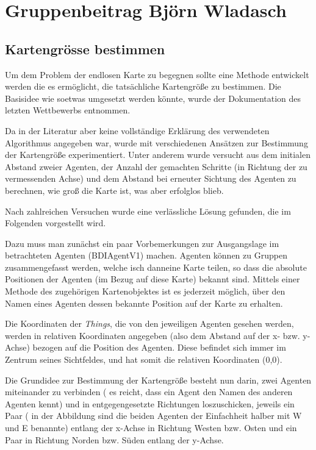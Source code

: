 \documentclass[runningheads]{llncs}
\begin{document}
	\section{Gruppenbeitrag Björn Wladasch}
	\subsection{Kartengrösse bestimmen}
	Um dem Problem der endlosen Karte zu begegnen sollte eine Methode entwickelt werden die es ermöglicht, die tatsächliche Kartengröße zu bestimmen. Die Basisidee wie soetwas umgesetzt werden könnte, wurde der Dokumentation des letzten Wettbewerbs \cite{MAPC2021} entnommen.  
	
	Da in der Literatur aber keine vollständige Erklärung des verwendeten Algorithmus angegeben war, wurde mit verschiedenen Ansätzen zur Bestimmung der Kartengröße experimentiert. Unter anderem wurde versucht aus dem initialen Abstand zweier Agenten, der Anzahl der gemachten Schritte (in Richtung der zu vermessenden Achse) und dem Abstand bei erneuter Sichtung des Agenten zu berechnen, wie groß die Karte ist, was aber erfolglos blieb.
	
	Nach zahlreichen Versuchen wurde eine verlässliche Lösung gefunden, die im Folgenden vorgestellt wird.
	
	Dazu muss man zunächst ein paar Vorbemerkungen zur Ausgangslage im betrachteten Agenten (BDIAgentV1) machen. Agenten können zu Gruppen zusammengefasst werden, welche isch danneine Karte teilen, so dass die absolute Positionen der Agenten (im Bezug auf diese Karte) bekannt sind. Mittels einer Methode des zugehörigen Kartenobjektes ist es jederzeit möglich, über den Namen eines Agenten dessen bekannte Position auf der Karte zu erhalten.
	
	Die Koordinaten der \textit{Things}, die von den jeweiligen Agenten gesehen werden, werden in relativen Koordinaten angegeben (also dem Abstand auf der x- bzw. y-Achse) bezogen auf die Position des Agenten. Diese befindet sich immer im Zentrum seines Sichtfeldes, und hat somit die relativen Koordinaten (0,0).
	
	
	Die Grundidee zur Bestimmung der Kartengröße besteht nun darin, zwei Agenten miteinander zu verbinden ( es reicht, dass ein Agent den Namen des anderen Agenten kennt) und in entgegengesetzte Richtungen loszuschicken, jeweils ein Paar ( in der Abbildung sind die beiden Agenten der Einfachheit halber mit W und E benannte) entlang der x-Achse in Richtung Westen bzw. Osten und ein Paar in Richtung Norden bzw. Süden entlang der y-Achse.
	
\end{document}
